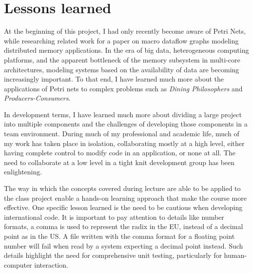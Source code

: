 
\section{Lessons learned}

At the beginning of this project, I had only recently become aware of Petri Nets, while researching
related work for a paper on macro dataflow graphs modeling distributed memory applications. In the
era of big data, heterogeneous computing platforms, and the apparent bottleneck of the
memory subsystem in multi-core architectures, modeling systems based on the availability of data
are becoming increasingly important. To that end, I have learned much more about the applications of
Petri nets to complex problems such as \textit{Dining Philosophers} and \textit{Producers-Consumers}.

In development terms, I have learned much more about dividing a large project into multiple components
and the challenges of developing those components in a team environment. During much of my professional
and academic life, much of my work has taken place in isolation, collaborating mostly at a high level,
either having complete control to modify code in an application, or none at all. The need to collaborate
at a low level in a tight knit development group has been enlightening.

The way in which the concepts covered during lecture are able to be applied to the class project
enable a hands-on learning approach that make the course more effective. One specific lesson learned
is the need to be cautious when developing international code. It is important to pay attention
to details like number formats, a comma is used to represent the radix in the EU, instead of a decimal
point as in the US. A file written with the comma format for a floating point number will fail when
read by a system expecting a decimal point instead. Such details highlight the need for comprehensive
unit testing, particularly for human-computer interaction.
